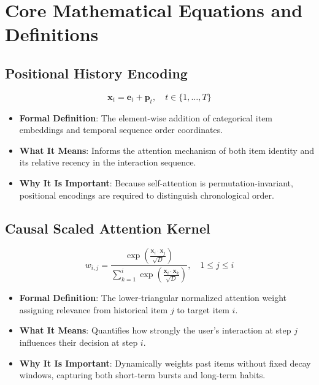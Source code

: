 \documentclass[11pt,a4paper]{article}
\theoremstyle{definition}
\begin{document}
\section{Core Mathematical Equations and Definitions}

\subsection{Positional History Encoding}
{\boldmath
\begin{equation}
\mathbf{x}_t = \mathbf{e}_t + \mathbf{p}_t, \quad t \in \{1, \dots, T\}
\end{equation}
}
\begin{itemize}
    \item \textbf{Formal Definition}: The element-wise addition of categorical item embeddings and temporal sequence order coordinates.
    \item \textbf{What It Means}: Informs the attention mechanism of both item identity and its relative recency in the interaction sequence.
    \item \textbf{Why It Is Important}: Because self-attention is permutation-invariant, positional encodings are required to distinguish chronological order.
\end{itemize}

\subsection{Causal Scaled Attention Kernel}
{\boldmath
\begin{equation}
w_{i, j} = \frac{\exp\left( \frac{\mathbf{x}_i \cdot \mathbf{x}_j}{\sqrt{D}} \right)}{\sum_{k=1}^i \exp\left( \frac{\mathbf{x}_i \cdot \mathbf{x}_k}{\sqrt{D}} \right)}, \quad 1 \le j \le i
\end{equation}
}
\begin{itemize}
    \item \textbf{Formal Definition}: The lower-triangular normalized attention weight assigning relevance from historical item $j$ to target item $i$.
    \item \textbf{What It Means}: Quantifies how strongly the user's interaction at step $j$ influences their decision at step $i$.
    \item \textbf{Why It Is Important}: Dynamically weights past items without fixed decay windows, capturing both short-term bursts and long-term habits.
\end{itemize}
\end{document}
